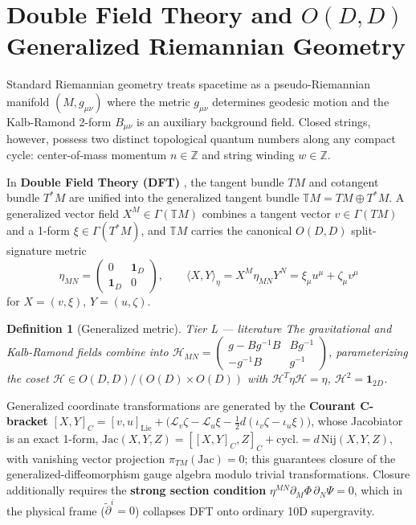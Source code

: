 \documentclass[11pt,a4paper]{article}
\newtheorem{definition}[theorem]{Definition}
\theoremstyle{remark}
\newcommand{\tierL}{\colorbox{blue!10}{\textsf{\scriptsize Tier L --- literature}}}
\begin{document}
\section{Double Field Theory and \texorpdfstring{$O(D,D)$}{O(D,D)} Generalized Riemannian Geometry}
\label{sec:dft}

Standard Riemannian geometry treats spacetime as a pseudo-Riemannian manifold $(M, g_{\mu\nu})$ where
the metric $g_{\mu\nu}$ determines geodesic motion and the Kalb-Ramond 2-form $B_{\mu\nu}$ is an
auxiliary background field. Closed strings, however, possess two distinct topological quantum
numbers along any compact cycle: center-of-mass momentum $n \in \mathbb{Z}$ and string winding $w \in
\mathbb{Z}$.

In \textbf{Double Field Theory (DFT)} \cite{HullZwiebach2009, HohmHullZwiebach2010}, the tangent
bundle $TM$ and cotangent bundle $T^*M$ are unified into the generalized tangent bundle $\mathbb{T}M
= TM \oplus T^*M$. A generalized vector field $X^M \in \Gamma(\mathbb{T}M)$ combines a tangent vector
$v \in \Gamma(TM)$ and a 1-form $\xi \in \Gamma(T^*M)$, and $\mathbb{T}M$ carries the canonical
$O(D,D)$ split-signature metric
\begin{equation}
    \eta_{MN} = \begin{pmatrix} 0 & \mathbf{1}_D \\ \mathbf{1}_D & 0 \end{pmatrix}, \qquad
    \langle X, Y \rangle_\eta = X^M \eta_{MN} Y^N = \xi_\mu u^\mu + \zeta_\mu v^\mu
\end{equation}
for $X = (v, \xi)$, $Y = (u, \zeta)$.

\begin{definition}[Generalized metric] \label{def:genmetric} \tierL
The gravitational and Kalb-Ramond fields combine into $\mathcal{H}_{MN} = \begin{pmatrix} g - B g^{-1}
B & B g^{-1} \\ -g^{-1} B & g^{-1} \end{pmatrix}$, parameterizing the coset
$\mathcal{H} \in O(D,D)/(O(D)\times O(D))$ with $\mathcal{H}^T\eta\mathcal{H}=\eta$,
$\mathcal{H}^2=\mathbf{1}_{2D}$.
\end{definition}

Generalized coordinate transformations are generated by the \textbf{Courant C-bracket} $[X,Y]_C =
[v,u]_{\mathrm{Lie}} + \big(\mathcal{L}_v\zeta - \mathcal{L}_u\xi - \tfrac12
d(\iota_v\zeta-\iota_u\xi)\big)$, whose Jacobiator is an exact 1-form, $\mathrm{Jac}(X,Y,Z) = [[X,Y]_C,
Z]_C + \text{cycl.} = d\,\mathrm{Nij}(X,Y,Z)$, with vanishing vector projection $\pi_{TM}(\mathrm{Jac})
= 0$; this guarantees closure of the generalized-diffeomorphism gauge algebra modulo trivial
transformations. Closure additionally requires the \textbf{strong section condition}
$\eta^{MN}\partial_M\Phi\,\partial_N\Psi = 0$, which in the physical frame ($\tilde\partial^i=0$)
collapses DFT onto ordinary 10D supergravity.
\end{document}
